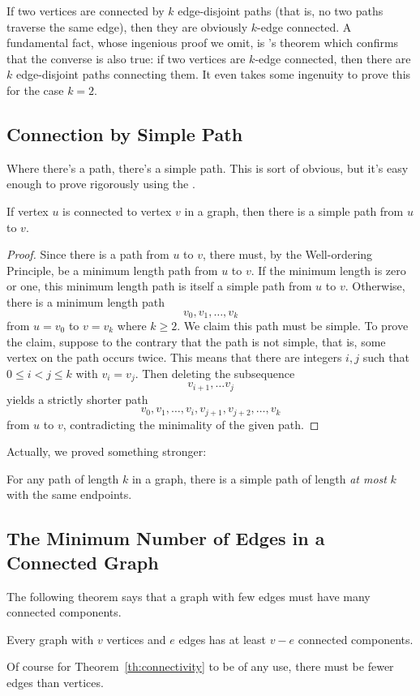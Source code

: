 If two vertices are connected by $k$ edge-disjoint paths (that is, no
two paths traverse the same edge), then they are obviously $k$-edge
connected.  A fundamental fact, whose ingenious proof we omit,
is 's theorem which confirms that the converse is also
true: if two vertices are $k$-edge connected, then there are $k$
edge-disjoint paths connecting them.  It even takes some ingenuity to
prove this for the case $k=2$.

\subsection{Connection by Simple Path}

Where there's a path, there's a simple path.  This is sort of obvious, but
it's easy enough to prove rigorously using the .

\begin{lemma}\label{simplepath}
If vertex $u$ is connected to vertex $v$ in a graph, then there is a
simple path from $u$ to $v$.
\end{lemma}

\begin{proof}
Since there is a path from $u$ to $v$, there must, by the Well-ordering
Principle, be a minimum length path from $u$ to $v$.  If the minimum
length is zero or one, this minimum length path is itself a simple path
from $u$ to $v$.
Otherwise, there is a minimum length path
\[
v_0, v_1,\dots, v_k
\]
from $u = v_0$ to $v = v_k$ where $k \geq 2$.  We claim this path must be
simple.
To prove the claim, suppose to the contrary that the path is not simple,
that is, some vertex on the path occurs twice.  This means that there are
integers $i,j$ such that $0 \leq i < j \leq k$ with $v_i= v_j$.  Then
deleting the subsequence
\[
v_{i+1}, \dots v_j
\]
yields a strictly shorter path
\[
v_0, v_1,\dots, v_i,v_{j+1},v_{j+2},\dots, v_k
\]
from $u$ to $v$, contradicting the minimality of the given path.
\end{proof}

Actually, we proved something stronger:
\begin{corollary}\label{ss}
For any path of length $k$ in a graph, there is a simple path of length
\emph{at most} $k$ with the same endpoints.
\end{corollary}

\subsection{The Minimum Number of Edges in a Connected Graph}
The following theorem says that a graph with few edges must have many
connected components.
\begin{theorem} \label{th:connectivity}
Every graph with $v$ vertices and $e$ edges has at least $v - e$ connected
components.
\end{theorem}
Of course for Theorem~\ref{th:connectivity} to be of any use, there must
be fewer edges than vertices.

